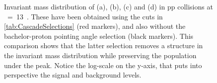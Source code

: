 \begin{figure}[t]
\hspace*{-1.5cm}
\hspace*{-1.5cm}	
	\caption{Invariant mass distribution of \rmXiM (a), \rmAxiP (b), \rmOmegaM (c) and \rmAomegaP (d) in pp collisions at \sqrtS~=~13~\tev. These have been obtained using the cuts in \tab\ref{tab:CascadeSelections} (red markers), and also without the bachelor-proton pointing angle selection (black markers). This comparison shows that the latter selection removes a structure in the invariant mass distribution while preserving the population under the peak. Notice the log-scale on the y-axis, that puts into perspective the signal and background levels.}
	\label{fig:WrongPA}
\end{figure}

